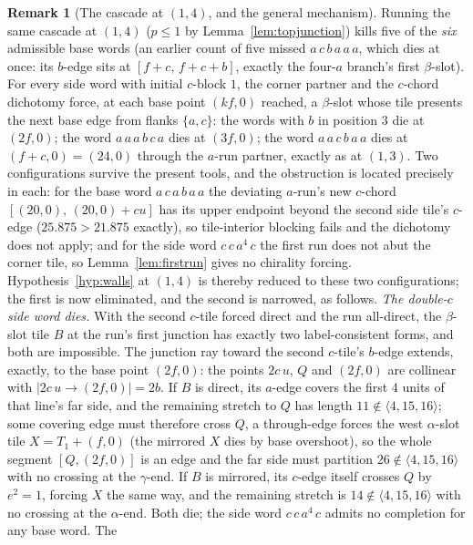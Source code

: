 \documentclass[11pt,reqno]{amsart}
\theoremstyle{plain}
\theoremstyle{definition}
\newtheorem{remark}[theorem]{Remark}
\begin{document}
\begin{remark}[The cascade at $(1,4)$, and the general mechanism]\label{rem:walls14}
Running the same cascade at $(1,4)$ ($p\le1$ by Lemma~\ref{lem:topjunction}) kills five of the
\emph{six} admissible base words (an earlier count of five missed $a\,c\,b\,a\,a\,a$, which dies
at once: its $b$-edge sits at $[f+c,\,f+c+b]$, exactly the four-$a$ branch's first $\beta$-slot). For every side word with initial $c$-block $1$, the corner partner and the
$c$-chord dichotomy force, at each base point $(kf,0)$ reached, a $\beta$-slot whose tile presents
the next base edge from flanks $\{a,c\}$: the words with $b$ in position $3$ die at $(2f,0)$; the
word $a\,a\,a\,b\,c\,a$ dies at $(3f,0)$; the word $a\,a\,c\,b\,a\,a$ dies at $(f+c,0)=(24,0)$
through the $a$-run partner, exactly as at $(1,3)$. Two configurations survive the present tools,
and the obstruction is located precisely in each: for the base word $a\,c\,a\,b\,a\,a$ the deviating
$a$-run's new $c$-chord $[(20,0),\,(20,0)+cu]$ has its upper endpoint beyond the second side tile's
$c$-edge ($25.875>21.875$ exactly), so tile-interior blocking fails and the dichotomy does not
apply; and for the side word $c\,c\,a^4\,c$ the first run does not abut the corner tile, so
Lemma~\ref{lem:firstrun} gives no chirality forcing. Hypothesis~\ref{hyp:walls} at $(1,4)$ is
thereby reduced to these two configurations; the first is now eliminated, and the second is
narrowed, as follows. \emph{The double-$c$ side word dies.} With the second $c$-tile forced direct
and the run all-direct, the $\beta$-slot tile $B$ at the run's first junction has exactly two
label-consistent forms, and both are impossible. The junction ray toward the second $c$-tile's
$b$-edge extends, exactly, to the base point $(2f,0)$: the points $2c\,u$, $Q$ and $(2f,0)$ are
collinear with $|2c\,u\to(2f,0)|=2b$. If $B$ is direct, its $a$-edge covers the first $4$ units of
that line's far side, and the remaining stretch to $Q$ has length $11\notin\langle4,15,16\rangle$;
some covering edge must therefore cross $Q$, a through-edge forces the west $\alpha$-slot tile
$X=T_1+(f,0)$ (the mirrored $X$ dies by base overshoot), so the whole segment $[Q,(2f,0)]$ is an
edge and the far side must partition $26\notin\langle4,15,16\rangle$ with no crossing at the
$\gamma$-end. If $B$ is mirrored, its $c$-edge itself crosses $Q$ by $e^2=1$, forcing $X$ the same
way, and the remaining stretch is $14\notin\langle4,15,16\rangle$ with no crossing at the
$\alpha$-end. Both die; the side word $c\,c\,a^4\,c$ admits no completion for any base word. The

\end{remark}
\end{document}
